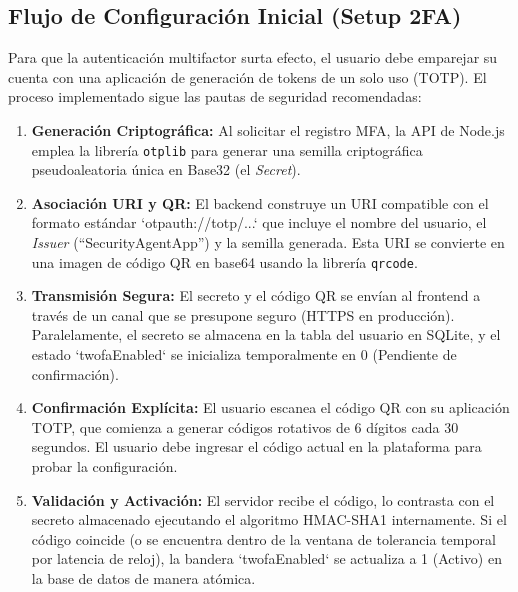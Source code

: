\documentclass[12pt,a4paper]{article}
\begin{document}
\subsection{Flujo de Configuración Inicial (Setup 2FA)}
Para que la autenticación multifactor surta efecto, el usuario debe emparejar su cuenta con una aplicación de generación de tokens de un solo uso (TOTP). El proceso implementado sigue las pautas de seguridad recomendadas:
\begin{enumerate}
    \item \textbf{Generación Criptográfica:} Al solicitar el registro MFA, la API de Node.js emplea la librería \texttt{otplib} para generar una semilla criptográfica pseudoaleatoria única en Base32 (el \textit{Secret}).
    \item \textbf{Asociación URI y QR:} El backend construye un URI compatible con el formato estándar `otpauth://totp/...` que incluye el nombre del usuario, el \textit{Issuer} (``SecurityAgentApp'') y la semilla generada. Esta URI se convierte en una imagen de código QR en base64 usando la librería \texttt{qrcode}.
    \item \textbf{Transmisión Segura:} El secreto y el código QR se envían al frontend a través de un canal que se presupone seguro (HTTPS en producción). Paralelamente, el secreto se almacena en la tabla del usuario en SQLite, y el estado `twofaEnabled` se inicializa temporalmente en 0 (Pendiente de confirmación).
    \item \textbf{Confirmación Explícita:} El usuario escanea el código QR con su aplicación TOTP, que comienza a generar códigos rotativos de 6 dígitos cada 30 segundos. El usuario debe ingresar el código actual en la plataforma para probar la configuración.
    \item \textbf{Validación y Activación:} El servidor recibe el código, lo contrasta con el secreto almacenado ejecutando el algoritmo HMAC-SHA1 internamente. Si el código coincide (o se encuentra dentro de la ventana de tolerancia temporal por latencia de reloj), la bandera `twofaEnabled` se actualiza a 1 (Activo) en la base de datos de manera atómica.
\end{enumerate}
\end{document}
